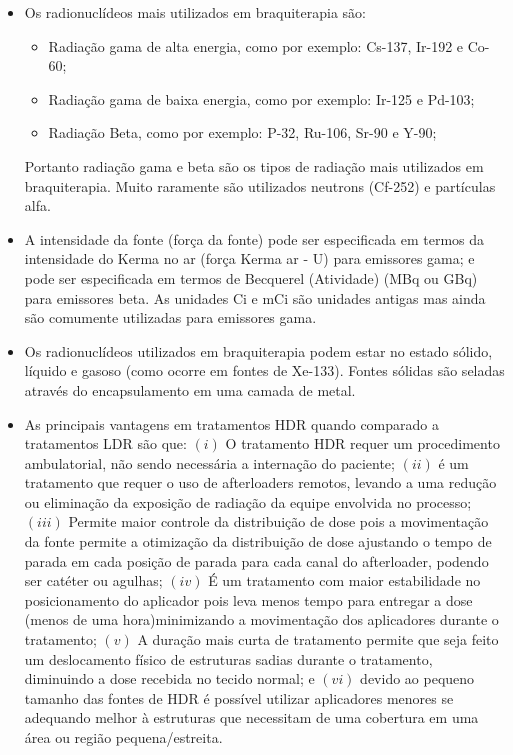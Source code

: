\documentclass[11pt,a4paper]{article}
\newcounter{exemplo}
\begin{document}
\begin{exemplo}[8. Braquiterapia]
\begin{itemize}
        \item Os radionuclídeos mais utilizados em braquiterapia são:
        
            \begin{itemize}[label=\textopenbullet]
                \item Radiação gama de alta energia, como por exemplo: Cs-137, Ir-192 e Co-60;
                \item Radiação gama de baixa energia, como por exemplo: Ir-125 e Pd-103;
                \item Radiação Beta, como por exemplo: P-32, Ru-106, Sr-90 e Y-90;
            \end{itemize}

            Portanto radiação gama e beta são os tipos de radiação mais utilizados em braquiterapia. Muito raramente são utilizados neutrons (Cf-252) e partículas alfa. 


        \item A intensidade da fonte (força da fonte) pode ser especificada em termos da intensidade do Kerma no ar (força Kerma ar - U) para emissores gama; e pode ser especificada em termos de Becquerel (Atividade) (MBq ou GBq) para emissores beta. As unidades Ci e mCi são unidades antigas mas ainda são comumente utilizadas para emissores gama.
        
        \item Os radionuclídeos utilizados em braquiterapia podem estar no estado sólido, líquido e gasoso (como ocorre em fontes de Xe-133). Fontes sólidas são seladas através do encapsulamento em uma camada de metal.
        
        \item As principais vantagens em tratamentos HDR quando comparado a tratamentos LDR são que: $(i)$ O tratamento HDR requer um procedimento ambulatorial, não sendo necessária a internação do paciente; $(ii)$ é um tratamento que requer o uso de afterloaders remotos, levando a uma redução ou eliminação da exposição de radiação da equipe envolvida no processo; $(iii)$ Permite maior controle da distribuição de dose pois a movimentação da fonte permite a otimização da distribuição de dose ajustando o tempo de parada em cada posição de parada para cada canal do afterloader, podendo ser catéter ou agulhas; $(iv)$ É um tratamento com maior estabilidade no posicionamento do aplicador pois leva menos tempo para entregar a dose (menos de uma hora)minimizando a movimentação dos aplicadores durante o tratamento;  $(v)$ A duração mais curta de tratamento permite que seja feito um deslocamento físico de estruturas sadias durante o tratamento, diminuindo a dose recebida no tecido normal; e $(vi)$ devido ao pequeno tamanho das fontes de HDR é possível utilizar aplicadores menores se adequando melhor à estruturas que necessitam de uma cobertura em uma área ou região pequena/estreita.
        


\end{itemize}
\end{exemplo}
\end{document}
